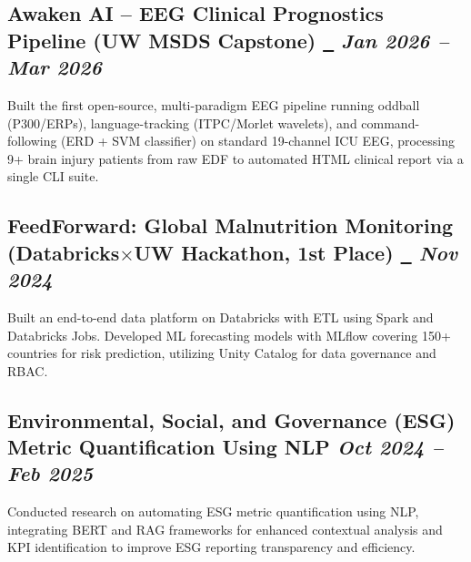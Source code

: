 \documentclass[10pt,a4paper]{article}
\begin{document}
\subsection{Awaken AI -- EEG Clinical Prognostics Pipeline (UW MSDS Capstone)%
\href{https://github.com/ayushmall0710/awaken-ai}{~\faExternalLink*} \hfill \textit{Jan 2026 -- Mar 2026}}
Built the first open-source, multi-paradigm EEG pipeline running oddball (P300/ERPs), language-tracking (ITPC/Morlet wavelets), and command-following (ERD + SVM classifier) on standard 19-channel ICU EEG, processing 9+ brain injury patients from raw EDF to automated HTML clinical report via a single CLI suite.

\subsection{FeedForward: Global Malnutrition Monitoring (Databricks$\times$UW Hackathon, 1st Place)%
\href{https://github.com/ayushmall0710/databricks-hackathon}{~\faExternalLink*} \hfill \textit{Nov 2024}}
Built an end-to-end data platform on Databricks with ETL using Spark and Databricks Jobs. Developed ML forecasting models with MLflow covering 150+ countries for risk prediction, utilizing Unity Catalog for data governance and RBAC.

\subsection{Environmental, Social, and Governance (ESG) Metric Quantification Using NLP \hfill \textit{Oct 2024 -- Feb 2025}}
Conducted research on automating ESG metric quantification using NLP, integrating BERT and RAG frameworks for enhanced contextual analysis and KPI identification to improve ESG reporting transparency and efficiency.

\end{document}
